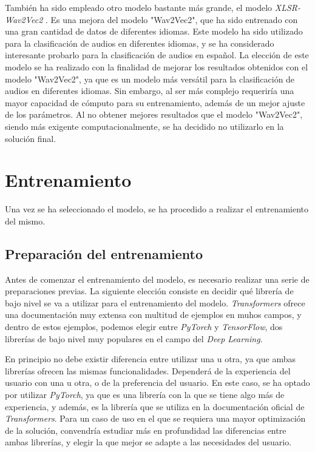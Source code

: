 También ha sido empleado otro modelo bastante más grande, el modelo \textit{XLSR-Wav2Vec2} \cite{conneau2020unsupervised}.
Es una mejora del modelo "Wav2Vec2", que ha sido entrenado con una gran cantidad de datos de diferentes idiomas.
Este modelo ha sido utilizado para la clasificación de audios en diferentes idiomas, y se ha considerado interesante probarlo para la clasificación de audios en español.
La elección de este modelo se ha realizado con la finalidad de mejorar los resultados obtenidos con el modelo "Wav2Vec2", ya que es un modelo más versátil para la clasificación de audios en diferentes idiomas. \cite{greekEmotionRecognition}
Sin embargo, al ser más complejo requeriría una mayor capacidad de cómputo para su entrenamiento, además de un mejor ajuste de los parámetros.
Al no obtener mejores resultados que el modelo "Wav2Vec2", siendo más exigente computacionalmente, se ha decidido no utilizarlo en la solución final.


\section{Entrenamiento}\label{seccion:entrenamiento}
Una vez se ha seleccionado el modelo, se ha procedido a realizar el entrenamiento del mismo.

\subsection{Preparación del entrenamiento}\label{seccion:preparacion-del-entrenamiento}
Antes de comenzar el entrenamiento del modelo, es necesario realizar una serie de preparaciones previas.
La siguiente elección consiste en decidir qué librería de bajo nivel se va a utilizar para el entrenamiento del modelo.
\textit{Transformers} ofrece una documentación muy extensa con multitud de ejemplos en muhos campos, y dentro de estos ejemplos, podemos elegir entre \textit{PyTorch} y \textit{TensorFlow}, dos librerías de bajo nivel muy populares en el campo del \textit{Deep Learning}.

En principio no debe existir diferencia entre utilizar una u otra, ya que ambas librerías ofrecen las mismas funcionalidades.
Dependerá de la experiencia del usuario con una u otra, o de la preferencia del usuario.
En este caso, se ha optado por utilizar \textit{PyTorch}, ya que es una librería con la que se tiene algo más de experiencia, y además, es la librería que se utiliza en la documentación oficial de \textit{Transformers}.
Para un caso de uso en el que se requiera una mayor optimización de la solución, convendría estudiar más en profundidad las diferencias entre ambas librerías, y elegir la que mejor se adapte a las necesidades del usuario.

